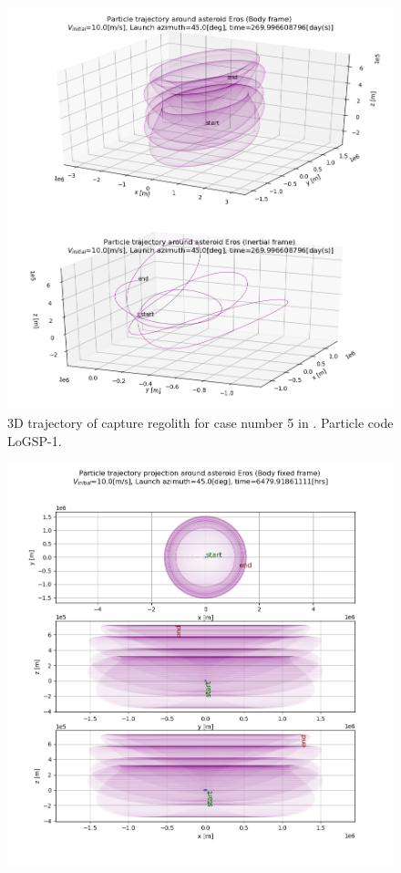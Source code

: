 \documentclass[print]{tudelft-report}
\begin{document}
\begin{appendices}
\begin{figure}[htb]
    \includegraphics[width=\textwidth, height=\textheight]{Results/Images/longest_edge_perturbations/3.2Density_1cmSize/3dTrajectory_10ms_45Azimuth_315solarPhase.png}
    \caption{3D trajectory of capture regolith for case number 5 in . Particle code LoGSP-1.}
    \label{fig:LoGSP_1_capture_case_5_3d_trajectory}
    \end{figure}
    \FloatBarrier
    \begin{figure}[htb]
    \centering
    \captionsetup{justification=centering}
    \includegraphics[width=\textwidth, height=\textheight]{Results/Images/longest_edge_perturbations/3.2Density_1cmSize/2dTrajectory_10ms_45Azimuth_315solarPhase_bodyFrame.png}

\end{figure}
\end{appendices}
\end{document}

